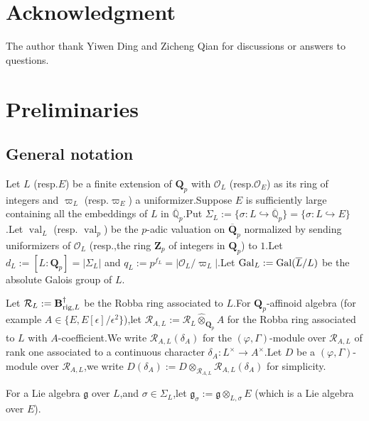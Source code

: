 \documentclass[10pt]{article}
\newcommand{\rig}{{\rm rig}}
\newcommand{\gal}{{\rm Gal}}
\DeclareMathOperator{\val}{val}
\newcommand{\BQ}{{\mathbb{Q}}}
\newcommand{\bB}{{\mathbf{B}}}
\newcommand{\bQ}{{\mathbf{Q}}}
\newcommand{\bZ}{{\mathbf{Z}}}
\newcommand{\co}{\mathcal O}
\newcommand{\cR}{\mathcal R}
\newcommand{\fg}{{\mathfrak{g}}}
\begin{document}
\section*{Acknowledgment}
The author thank Yiwen Ding and Zicheng Qian for discussions or answers to questions.\;

\section{Preliminaries}

\subsection{General notation}


\noindent Let $L$ (resp.\;$E$) be a finite extension of $\bQ_p$ with $\co_L$ (resp.\;$\co_E$) as its ring of integers and $\varpi_L$ (resp.\;$\varpi_E$) a uniformizer.\;Suppose $E$ is sufficiently large containing all the embeddings of $L$ in $\overline{\BQ}_p$.\;Put $\Sigma_L:=\{\sigma: L\hookrightarrow \overline{\BQ}_p\} =\{\sigma: L\hookrightarrow E\}$.\;Let $\val_L$ (resp. $\val_p$) be the $p$-adic valuation on $\overline{\bQ}_p$ normalized by sending uniformizers of $\co_L$ (resp.,\;the ring $\bZ_p$ of integers in $\bQ_p$) to $1$.\;Let $d_L:=[L:\bQ_p]=|\Sigma_L|$ and $q_L:=p^{f_L}=|\co_L/\varpi_L|$.\;Let $\gal_{L}:=\gal(\overline{L}/L)$ be the absolute Galois group of $L$.\;


Let $\cR_{L}:=\bB_{\rig,L}^{\dagger}$ be the Robba ring associated to $L$.\;For $\bQ_p$-affinoid algebra (for example $A\in\{E,E[\epsilon]/\epsilon^2\}$),\;let $\cR_{A,L}:=\cR_{L}\widehat{\otimes}_{\bQ_p} A$ for the Robba ring associated to $L$ with $A$-coefficient.\;We write $\cR_{A,L}(\delta_A)$ for the $(\varphi,\Gamma)$-module over $\cR_{A,L}$ of rank one associated to a continuous character $\delta_A:L^\times\rightarrow A^\times$.\;Let $D$ be a $(\varphi,\Gamma)$-module over $\cR_{A,L}$,\;we write $D(\delta_A):=D\otimes_{\cR_{A,L}}\cR_{A,L}(\delta_A)$ for simplicity.\;

For a Lie algebra $\fg$ over $L$,\;and $\sigma\in \Sigma_L$,\;let $\fg_{\sigma}:=\fg\otimes_{L,\sigma} E$ (which is  a Lie algebra over $E$).\;
\end{document}
